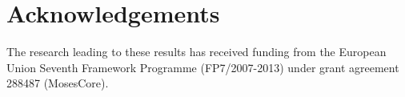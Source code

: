 \documentclass{pbml}
\begin{document}


\section*{Acknowledgements}

The research leading to these results has received funding from the European Union Seventh Framework Programme (FP7/2007-2013) under grant agreement 288487 (MosesCore).




\correspondingaddress
\end{document}
